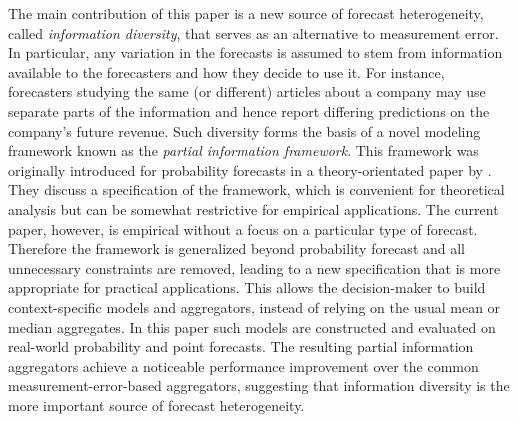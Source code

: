 \documentclass[11pt]{article}
\theoremstyle{definition}
\theoremstyle{definition}
\begin{document}
The main contribution of this paper is a new source of forecast heterogeneity, called \textit{information diversity}, that serves as an alternative to measurement error. In particular,  any variation in the forecasts is assumed to stem from information available to the forecasters and how they decide to use it. For instance, forecasters studying the same (or different) articles about a company may use separate parts of the information and hence report differing predictions on the company's future revenue. Such diversity forms the basis of a novel modeling framework known as the \textit{partial information framework}. This framework was originally introduced for probability forecasts in a theory-orientated paper by \cite{satopaamodeling}.  They discuss a specification of the framework, which is convenient for theoretical analysis but can be somewhat restrictive for empirical applications. The current paper, however, is empirical without a focus on a particular type of forecast. Therefore the framework is generalized beyond probability forecast and all unnecessary constraints are removed, leading to a new specification that is more appropriate for practical applications. This allows the decision-maker to build context-specific models and aggregators, instead of relying on the usual mean or median aggregates. In this paper such models are constructed and evaluated on real-world  probability and point forecasts. The resulting partial information aggregators achieve a noticeable performance improvement over the common measurement-error-based aggregators, suggesting that  information diversity is the more important  source of forecast heterogeneity. 








\end{document}
